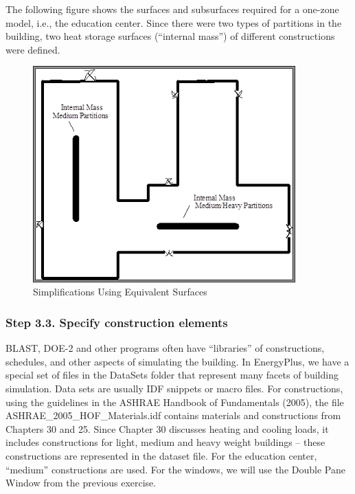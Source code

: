 The following figure shows the surfaces and subsurfaces required for a one-zone model, i.e., the education center. Since there were two types of partitions in the building, two heat storage surfaces (``internal mass'') of different constructions were defined.

\begin{figure}[hbtp] %
\centering
\includegraphics[width=0.9\textwidth, height=0.9\textheight, keepaspectratio=true]{media/image015.png}
\caption{Simplifications Using Equivalent Surfaces \protect \label{fig:simplifications-using-equivalent-surfaces}}
\end{figure}

\subsubsection{Step 3.3. Specify construction elements}\label{step-3.3.-specify-construction-elements}

BLAST, DOE-2 and other programs often have ``libraries'' of constructions, schedules, and other aspects of simulating the building. In EnergyPlus, we have a special set of files in the DataSets folder that represent many facets of building simulation. Data sets are usually IDF snippets or macro files. For constructions, using the guidelines in the ASHRAE Handbook of Fundamentals (2005), the file ASHRAE\_2005\_HOF\_Materials.idf contains materials and constructions from Chapters 30 and 25. Since Chapter 30 discusses heating and cooling loads, it includes constructions for light, medium and heavy weight buildings -- these constructions are represented in the dataset file. For the education center, ``medium'' constructions are used. For the windows, we will use the Double Pane Window from the previous exercise.

